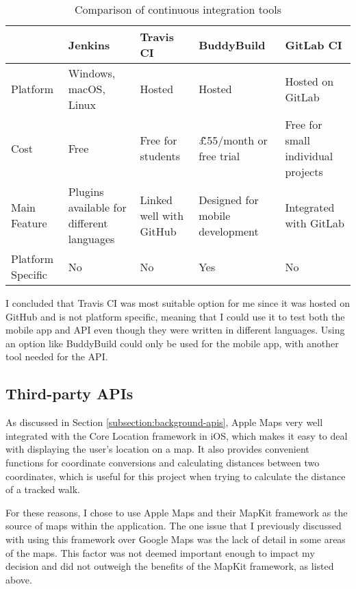 \begin{table}[hbt]
  \centering
  \begin{tabular}{|m{1.5cm}||M{3cm}|M{3cm}|M{3cm}|M{3cm}|}
    \hline
     & \textbf{Jenkins} & \textbf{Travis CI} & \textbf{BuddyBuild} & \textbf{GitLab CI} \\
    \hline
    \hline
    Platform & Windows, macOS, Linux & Hosted & Hosted & Hosted on GitLab\\
    \hline
    Cost & Free & Free for students & \~\pounds55/month or free trial & Free for small individual projects\\
    \hline
    Main Feature & Plugins available for different languages & Linked well with GitHub & Designed for mobile development & Integrated with GitLab\\
    \hline
    Platform Specific & No & No & Yes & No\\
    \hline
  \end{tabular}
  \caption{Comparison of continuous integration tools}
  \label{table:ci-tools-options}
\end{table}




I concluded that Travis CI was most suitable option for me since it was hosted on GitHub and is not platform specific, meaning that I could use it to test both the mobile app and API even though they were written in different languages. Using an option like BuddyBuild could only be used for the mobile app, with another tool needed for the API.

\subsection{Third-party APIs}

As discussed in Section \ref{subsection:background-apis}, Apple Maps very well integrated with the Core Location framework in iOS, which makes it easy to deal with displaying the user's location on a map. It also provides convenient functions for coordinate conversions and calculating distances between two coordinates, which is useful for this project when trying to calculate the distance of a tracked walk.

For these reasons, I chose to use Apple Maps and their MapKit framework as the source of maps within the application. The one issue that I previously discussed with using this framework over Google Maps was the lack of detail in some areas of the maps. This factor was not deemed important enough to impact my decision and did not outweigh the benefits of the MapKit framework, as listed above.

